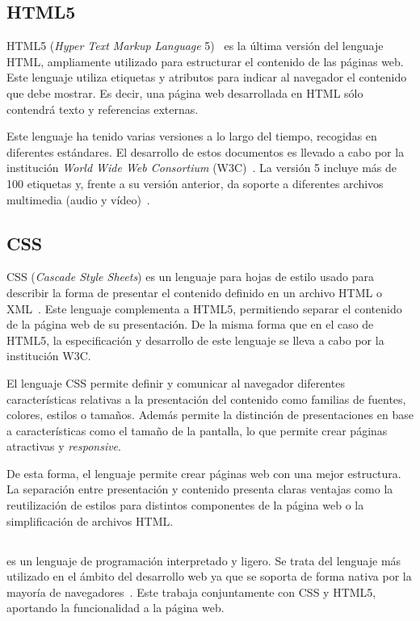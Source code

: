 \subsection{HTML5}
HTML5 (\textit{Hyper Text Markup Language} 5)~\cite{html5-standard} es la última versión del lenguaje HTML, ampliamente utilizado para estructurar el contenido de las páginas web. Este lenguaje utiliza etiquetas y atributos para indicar al navegador el contenido que debe mostrar. Es decir, una página web desarrollada en HTML sólo contendrá texto y referencias externas. 

Este lenguaje ha tenido varias versiones a lo largo del tiempo, recogidas en diferentes estándares. El desarrollo de estos documentos es llevado a cabo por la institución \textit{World Wide Web Consortium} (W3C)~\cite{www-consortium}\@. La versión 5 incluye más de 100 etiquetas y, frente a su versión anterior, da soporte a diferentes archivos multimedia (audio y vídeo)~\cite{htm4vshtml5}\@.

\subsection{CSS}

CSS (\textit{Cascade Style Sheets}) es un lenguaje para hojas de estilo usado para describir la forma de presentar el contenido definido en un archivo HTML o XML~\cite{css}\@. Este lenguaje complementa a HTML5, permitiendo separar el contenido de la página web de su presentación. De la misma forma que en el caso de HTML5, la especificación y desarrollo de este lenguaje se lleva a cabo por la institución W3C.

El lenguaje CSS permite definir y comunicar al navegador diferentes características relativas a la presentación del contenido como familias de fuentes, colores, estilos o tamaños. Además permite la distinción de presentaciones en base a características como el tamaño de la pantalla, lo que permite crear páginas atractivas y \textit{responsive}. 

De esta forma, el lenguaje permite crear páginas web con una mejor estructura. La separación entre presentación y contenido presenta claras ventajas como la reutilización de estilos para distintos componentes de la página web o la simplificación de archivos HTML\@.

\subsection{\js}
{\js} es un lenguaje de programación interpretado y ligero. Se trata del lenguaje más utilizado en el ámbito del desarrollo web ya que se soporta de forma nativa por la mayoría de navegadores~\cite{javascript}\@. Este trabaja conjuntamente con CSS y HTML5, aportando la funcionalidad a la página web.

